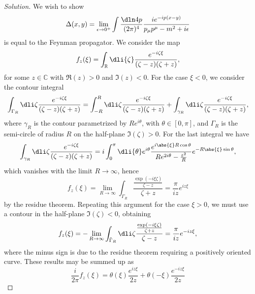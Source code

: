 \begin{proof}[Solution]
   We wish to show
   \begin{equation*}
       \Delta(x,y) = \lim_{\epsilon \to 0^+}{\int \frac{\dln4p}{(2\pi)^4} \frac{i e^{-ip(x - y)}}{p_\mu p^\mu - m^2 + i \epsilon}}
   \end{equation*}
   is equal to the Feynman propagator. We consider the map
   \begin{equation*}
      f_{z}(\xi) = \int_{\mathbb{R}} \dli{\zeta} \frac{e^{-i \zeta \xi}}{(\zeta - z)(\zeta + z)},
   \end{equation*}
   for some \(z \in \mathbb{C}\) with \(\Re(z) > 0\) and \(\Im(z) < 0\). For the case \(\xi < 0\), we consider the contour integral
   \begin{equation*}
      \int_{\Gamma_R} \dli\zeta \frac{e^{-i \zeta \xi}}{(\zeta - z)(\zeta + z)} = \int_{-R}^{R} \dli \zeta \frac{e^{-i \zeta \xi}}{(\zeta - z)(\zeta + z)} + \int_{\gamma_R} \dli\zeta \frac{e^{-i \zeta \xi}}{(\zeta - z)(\zeta + z)},
   \end{equation*}
   where \(\gamma_R\) is the contour parametrized by \(Re^{i \theta}\), with \(\theta \in [0, \pi]\), and \(\Gamma_R\) is the semi-circle of radius \(R\) on the half-plane \(\Im(\zeta) > 0\). For the last integral we have
   \begin{equation*}
      \int_{\gamma_R} \dli\zeta \frac{e^{-i \zeta \xi}}{(\zeta - z)(\zeta + z)} = i \int_0^{\pi} \dli{\theta} e^{i\theta} \frac{e^{i\abs{\xi} R \cos\theta}}{R e^{2i\theta} - \frac{z^2}{R}} e^{-R \abs{\xi}\sin\theta},
   \end{equation*}
   which vanishes with the limit \(R \to \infty\), hence
   \begin{equation*}
      f_z(\xi) = \lim_{R \to \infty} \int_{\Gamma_R} \frac{\frac{\exp(-i \xi \zeta)}{\zeta - z}}{\zeta + z} = \frac{\pi}{iz} e^{i z \xi}
   \end{equation*}
   by the residue theorem. Repeating this argument for the case \(\xi > 0\), we must use a contour in the half-plane \(\Im(\zeta) < 0\), obtaining
   \begin{equation*}
      f_z(\xi) = - \lim_{R \to \infty} \int_{\tilde{\Gamma}_R}\dli\zeta \frac{\frac{\exp(-i \xi \zeta)}{\zeta + z}}{\zeta - z} = \frac{\pi}{iz}e^{-iz \xi},
   \end{equation*}
   where the minus sign is due to the residue theorem requiring a positively oriented curve. These results may be summed up as
   \begin{equation*}
      \frac{i}{2\pi} f_z(\xi) = \theta(\xi) \frac{e^{iz \xi}}{2z} + \theta(-\xi) \frac{e^{-iz\xi}}{2z}

\end{equation*}
\end{proof}
